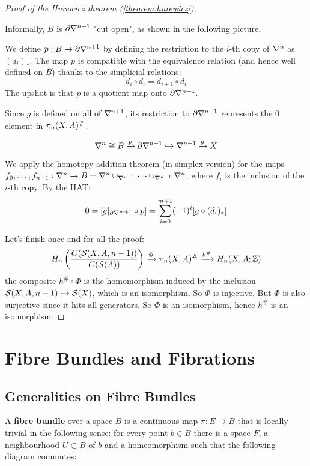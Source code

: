 \begin{proof}[Proof of the Hurewicz theorem (\ref{theorem:hurewicz})]
\begin{claimproof}
Informally, $B$ is $\partial\nabla^{n+1}$ "cut open", as shown in the following picture.

\smallskip
We define $p:B\to\partial\nabla^{n+1}$ by defining the restriction to the $i$-th copy of $\nabla^n$ as $(d_i)_*$. The map $p$ is compatible with the equivalence relation (and hence well defined on $B$) thanks to the simplicial relations:
\[d_i\circ d_i=d_{i+1}\circ d_i\]
The upshot is that $p$ is a quotient map onto $\partial\nabla^{n+1}$.

Since $g$ is defined on all of $\nabla^{n+1}$, its restriction to $\partial\nabla^{n+1}$ represents the $0$ element in $\pi_n(X,A)^\#$.

\[\nabla^n\cong B\xrightarrow{p}\partial\nabla^{n+1}\hookrightarrow\nabla^{n+1}\xrightarrow{g}X\]

We apply the homotopy addition theorem (in simplex version) for the maps ${{f}_0,\dots,{f}_{n+1}}:\nabla^{n}\to B=\nabla^{n}\cup_{\nabla^{n-1}}\dots\cup_{\nabla^{n-1}}\nabla^{n}$, where $f_i$ is the inclusion of the $i$-th copy.
By the HAT:
\[0=[g|_{\partial \nabla^{m+1}}\circ p]=\sum_{i=0}^{m+1}(-1)^i[g\circ (d_i)_*]\]

\end{claimproof}

Let's finish once and for all the proof:
\[H_n\left(\frac{C(\mathcal{S}(X,A,n-1))}{C(\mathcal{S}(A))}\right)\xrightarrow{\Phi}\pi_n(X,A)^\#\xrightarrow{h^\#}H_n(X,A;{\mathbb Z})\]
the composite $h^\#\circ\Phi$ is the homomorphism induced by the inclusion $\mathcal{S}(X,A,n-1)\hookrightarrow \mathcal{S}(X)$, which is an isomorphism. So $\Phi$ is injective. But $\Phi$ is also surjective since it hits all generators. So $\Phi$ is an isomorphism, hence $h^\#$ is an isomorphism.
\end{proof}



\chapter{Fibre Bundles and Fibrations}

\section{Generalities on Fibre Bundles}

A \textbf{fibre bundle} over a space $B$ is a continuous map $\pi:E\to B$ that is locally trivial in the following sense: for every point $b\in B$ there is a space $F$, a neighbourhood $U\subset B$ of $b$ and a homeomorphism such that the following diagram commutes:
\begin{center}
\end{center}

